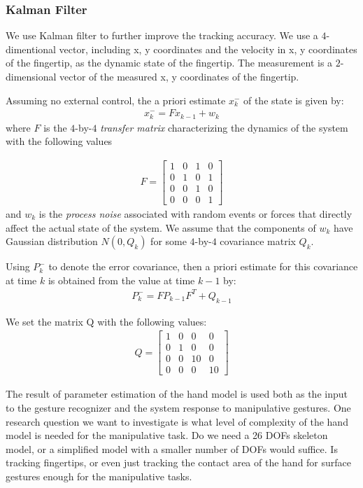 \subsubsection{Kalman Filter}
We use Kalman filter to further improve the tracking accuracy. We use a
$4$-dimentional vector, including x, y coordinates and the velocity in x, y
coordinates of the fingertip, as the dynamic state of the fingertip.
The measurement is a $2$-dimensional vector of the measured x, y
coordinates of the fingertip. 

Assuming no external control, the a priori estimate $x_k^-$ of the state is
given by:
\begin{align*}
x_k^- = Fx_{k - 1} + w_k
\end{align*}
where $F$ is the $4$-by-$4$ \textit{transfer matrix} characterizing the
dynamics of the system with the following values

\begin{align*}
F = \left[ \begin{array}{cccc}
	1 & 0 & 1 & 0 \\
	0 & 1 & 0 & 1 \\
	0 & 0 & 1 & 0 \\
	0 & 0 & 0 & 1 \end{array} \right]
\end{align*}
and $w_k$ is the \textit{process noise} associated with random events or forces
that directly affect the actual state of the system. We assume that the 
components of $w_k$ have Gaussian distribution $N(0, Q_k)$ for some $4$-by-$4$ 
covariance matrix $Q_k$.

Using $P_k^-$ to denote the error covariance, then a priori estimate for this
covariance at time $k$ is obtained from the value at time $k - 1$ by:
\begin{align*}
P_k^- = FP_{k - 1}F^T + Q_{k - 1}
\end{align*}

We set the matrix Q with the following values:
\begin{align*}
Q = \left[ \begin{array}{cccc}
	1 & 0 & 0 & 0 \\
	0 & 1 & 0 & 0 \\
	0 & 0 & 10 & 0 \\
	0 & 0 & 0 & 10 \end{array} \right]
\end{align*}
  
The result of parameter estimation of the hand model is used both as the input
to the gesture recognizer and the system response to manipulative gestures. One
research question we want to investigate is what level of complexity of the
hand model is needed for the manipulative task. Do we need a 26 DOFs skeleton
model, or a simplified model with a smaller number of DOFs would suffice. Is
tracking fingertips, or even just tracking the contact area of the hand for
surface gestures enough for the manipulative tasks.

